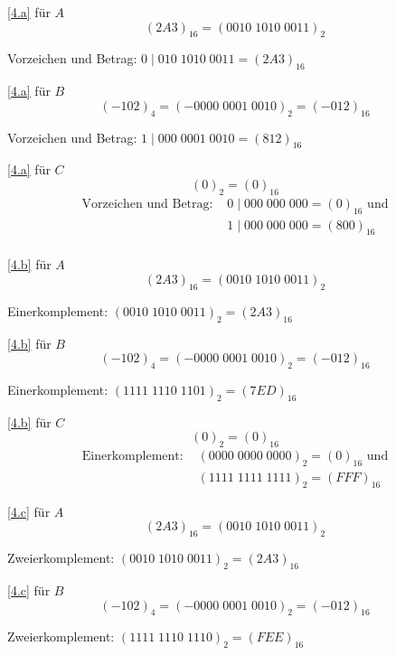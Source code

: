 \documentclass[a4paper, margins=3cm, newpage]{homework}
\begin{document}
\begin{solution}
\ref{4.a} für \(A\) \\
\[(2A3)_{16} = (0010\;1010\;0011)_2\]
\begin{center}
Vorzeichen und Betrag: \(0 \;|\; 010\;1010\;0011 = (2A3)_{16}\)
\end{center}

\ref{4.a} für \(B\) \\
\[(-102)_4 = (-0000\;0001\;0010)_2 = (-012)_{16}\]
\begin{center}
Vorzeichen und Betrag: \(1 \;|\; 000\;0001\;0010 = (812)_{16}\) 
\end{center}

\ref{4.a} für \(C\) \\
\[(0)_2 = (0)_{16}\]
\begin{align*}
	\text{Vorzeichen und Betrag: } &0 \;|\; 000\;000\;000 = (0)_{16} \text{ und} \\
								  &1 \;|\; 000\;000\;000 = (800)_{16} \\
\end{align*}

\ref{4.b} für \(A\) \\
\[(2A3)_{16} = (0010\;1010\;0011)_2\]
\begin{center}
	Einerkomplement: \((0010\;1010\;0011)_2 = (2A3)_{16}\)
\end{center}

\ref{4.b} für \(B\) \\
\[(-102)_4 = (-0000\;0001\;0010)_2 = (-012)_{16}\]
\begin{center}
	Einerkomplement: \((1111\;1110\;1101)_2 = (7ED)_{16}\)
\end{center}

\ref{4.b} für \(C\) \\
\[(0)_2 = (0)_{16}\]
\begin{align*}
	\text{Einerkomplement: } & (0000\;0000\;0000)_2 = (0)_{16} \text{ und} \\
							 & (1111\;1111\;1111)_2 = (FFF)_{16}
\end{align*}

\ref{4.c} für \(A\) \\
\[(2A3)_{16} = (0010\;1010\;0011)_2\]
\begin{center}
	Zweierkomplement: \((0010\;1010\;0011)_2 = (2A3)_{16}\)
\end{center}

\ref{4.c} für \(B\) \\
\[(-102)_4 = (-0000\;0001\;0010)_2 = (-012)_{16}\]
\begin{center}
	Zweierkomplement: \((1111\;1110\;1110)_2 = (FEE)_{16}\)
\end{center}


\end{solution}
\end{document}

